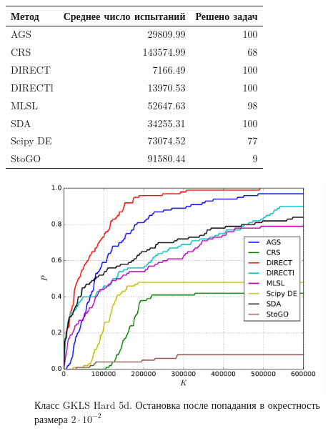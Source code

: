 \documentclass[a4paper]{article}
\begin{document}
\begin{tabular}{lrr}
\hline
 Метод    &   Среднее число испытаний &   Решено задач \\
\hline
 AGS      &                  29809.99 &            100 \\
 CRS      &                 143574.99 &             68 \\
 DIRECT   &                   7166.49 &            100 \\
 DIRECTl  &                  13970.53 &            100 \\
 MLSL     &                  52647.63 &             98 \\
 SDA      &                  34255.31 &            100 \\
 Scipy DE &                  73074.52 &             77 \\
 StoGO    &                  91580.44 &              9 \\
\hline
\end{tabular}
\begin{figure}[H]
  \center
  \includegraphics[width=0.95\textwidth]{../experiments/gklsh5d/cmc.pdf}
  \caption{Класс GKLS Hard 5d. Остановка после попадания в окрестность размера $2\cdot10^{-2}$}
  \label{fig:}
\end{figure}
\end{document}
